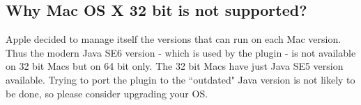 \documentclass[10pt]{article}
\begin{document}
\subsection{Why Mac OS X 32 bit is not supported?}
Apple decided to manage itself the versions that can run on each Mac version. Thus the modern Java SE6 version - which is used by the plugin - is not available on 32 bit Macs but on 64 bit only. The 32 bit Macs have just Java SE5 version available. Trying to port the plugin to the ``outdated" Java version is not likely to be done, so please consider upgrading your OS.
\end{document}
